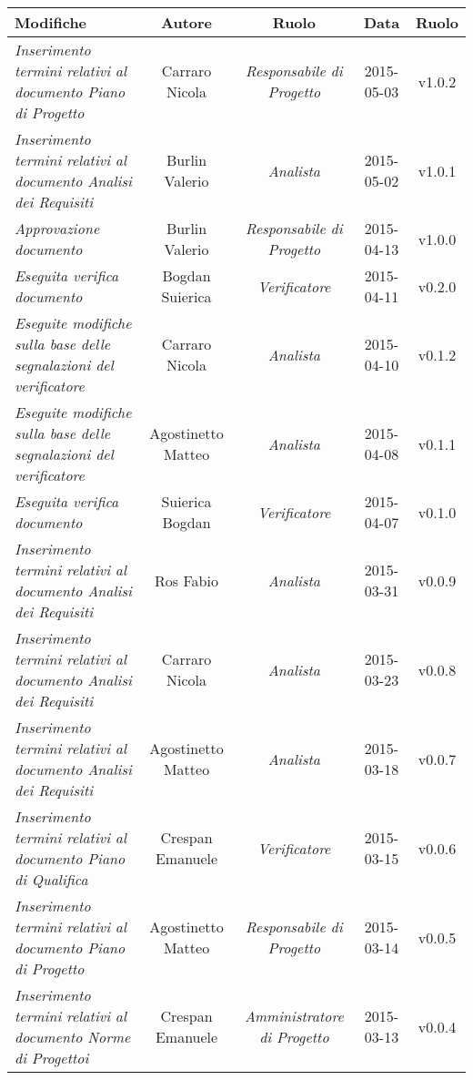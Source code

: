 \newpage

\begin{table}[h]
\centering
\begin{tabular}{|p{}|c|c|c|c|}
	\toprule
		\textbf{Modifiche} & \textbf{Autore} & \textbf{Ruolo} & \textbf{Data} & \textbf{Ruolo} \\
	\midrule
	\midrule
		\textit{Inserimento termini relativi al documento Piano di Progetto} & Carraro Nicola & \textit{Responsabile di Progetto} & 2015-05-03 & v1.0.2 \\
	\midrule
		\textit{Inserimento termini relativi al documento Analisi dei Requisiti} & Burlin Valerio & \textit{Analista} & 2015-05-02 & v1.0.1 \\
	\midrule
		\textit{Approvazione documento} & Burlin Valerio & \textit{Responsabile di Progetto} & 2015-04-13 & v1.0.0 \\
	\midrule
		\textit{Eseguita verifica documento} & Bogdan Suierica & \textit{Verificatore} & 2015-04-11 & v0.2.0 \\
	\midrule
		\textit{Eseguite modifiche sulla base delle segnalazioni del verificatore} & Carraro Nicola & \textit{Analista} & 2015-04-10 & v0.1.2 \\
	\midrule
		\textit{Eseguite modifiche sulla base delle segnalazioni del verificatore} & Agostinetto Matteo & \textit{Analista} & 2015-04-08 & v0.1.1 \\
	\midrule
		\textit{Eseguita verifica documento} & Suierica Bogdan & \textit{Verificatore} & 2015-04-07 & v0.1.0 \\
	\midrule
		\textit{Inserimento termini relativi al documento Analisi dei Requisiti} & Ros Fabio & \textit{Analista} & 2015-03-31 & v0.0.9 \\
	\midrule
		\textit{Inserimento termini relativi al documento Analisi dei Requisiti} & Carraro Nicola & \textit{Analista} & 2015-03-23 & v0.0.8 \\
	\midrule
		\textit{Inserimento termini relativi al documento Analisi dei Requisiti} & Agostinetto Matteo & \textit{Analista} & 2015-03-18 & v0.0.7 \\
	\midrule
		\textit{Inserimento termini relativi al documento Piano di Qualifica} & Crespan Emanuele & \textit{Verificatore} & 2015-03-15 & v0.0.6 \\
	\midrule
		\textit{Inserimento termini relativi al documento Piano di Progetto} & Agostinetto Matteo & \textit{Responsabile di Progetto} & 2015-03-14 & v0.0.5 \\
	\midrule
		\textit{Inserimento termini relativi al documento Norme di Progettoi} & Crespan Emanuele & \textit{Amministratore di Progetto} & 2015-03-13 & v0.0.4 \\
	\bottomrule
\end{tabular}	
\end{table}

